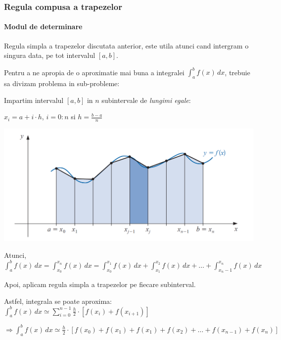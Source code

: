 \documentclass{article}
\begin{document}
\subsubsection{Regula compusa a trapezelor}
\paragraph{Modul de determinare}

\tabto{0.5cm}\begin{minipage}{0.7\textwidth}
    \tabto{0.5cm} Regula simpla a trapezelor discutata anterior, este utila atunci cand intergram o singura data, pe tot intervalul $[a,b]$.
    
    \tabto{0.5cm} Pentru a ne apropia de o aproximatie mai buna a integralei $\int_a^b f(x)\, dx$, trebuie sa divizam problema in sub-probleme:
    
    \tabto{0.5cm} Impartim intervalul $[a,b]$ in $n$ subintervale de \textit{lungimi egale}: 
    
    $x_i = a + i \cdot h$, $i = 0:n$ si $h=\frac{b-a}{n}$
\end{minipage}
\begin{minipage}{0.7\textwidth}
    \includegraphics[scale=0.25]{trapez_compus_grafic}
\end{minipage}\vspace{0.25cm}

Atunci, $\int_a^b f(x)\, dx = \int_{x_0}^{x_n} f(x)\, dx =  \int_{x_0}^{x_1} f(x)\, dx +  \int_{x_1}^{x_2} f(x)\, dx + \dots +  \int_{x_n-1}^{x_n} f(x)\, dx$ \vspace{0.1cm}

Apoi, aplicam regula simpla a trapezelor pe fiecare subinterval. 

Astfel, integrala se poate aproxima:
$\int_a^b f(x)\, dx \simeq \sum\limits_{i=0}^{n-1} \frac{h}{2} \cdot [f(x_i) + f(x_{i+1})]$

$\Rightarrow \int_a^b f(x)\, dx \simeq \frac{h}{2} \cdot [f(x_0) + f(x_1) + f(x_1) + f(x_2) + \dots + f(x_{n-1}) + f(x_n)]$
\end{document}
